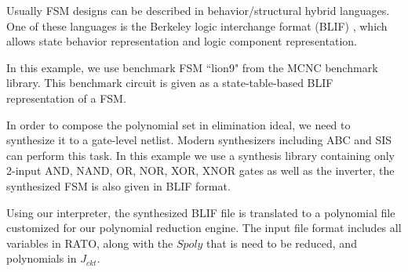 Usually FSM designs can be described in behavior/structural hybrid languages.
One of these languages is the Berkeley logic interchange format (BLIF) \cite{BLIF},
which allows state behavior representation and logic component representation.

\begin{Example}
In this example, we use benchmark FSM ``lion9" from the MCNC benchmark library.
This benchmark circuit is given as a state-table-based BLIF representation of a FSM.


In order to compose the polynomial set in elimination ideal, we need to synthesize it to a 
gate-level netlist. Modern synthesizers including ABC \cite{brayton2010abc} and SIS \cite{SIS} 
can perform this task. In this example we use a synthesis library containing only 2-input 
AND, NAND, OR, NOR, XOR, XNOR gates as well as the inverter, the synthesized FSM is also given in 
BLIF format.


Using our interpreter, the synthesized BLIF file is translated to a polynomial file customized for our 
polynomial reduction engine. 
The input file format includes all 
variables in RATO, along with the $Spoly$ that is need to be reduced, and polynomials in $J_{ckt}$.
% 


\end{Example}
